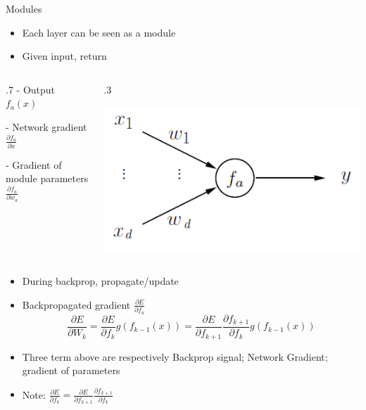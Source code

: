 \documentclass[12pt,notes,mathserif]{beamer}
\newcommand{\begincols}[1]{\begin{column}{#1}}
\newcommand{\stopcols}{\end{column}}
\newcommand{\pp}[2]{\frac{\partial #1}{\partial #2}}
\providecommand{\tightlist}{%
	\setlength{\itemsep}{0pt}\setlength{\parskip}{0pt}}
\begin{document}
\begin{frame}{Modules}

\begin{itemize}
\tightlist
\item
  Each layer can be seen as a module
\item
  Given input, return
\end{itemize}

\begin{columns}
    \begincols{.7\textwidth}
    - Output $f_{a}(x)$
    
    - Network gradient $\frac{\partial f_{a}}{\partial x}$
    
    - Gradient of module parameters $\frac{\partial f_{a}}{\partial w_a}$
    \stopcols
    \begincols{.3\textwidth}
    \begin{center}
        \includegraphics[width=\textwidth]{2018-04-15-13-09-43.png}
    \end{center}
    \stopcols
\end{columns}

\begin{itemize}
\tightlist
\item
  During backprop, propagate/update
\item
  Backpropagated gradient \(\frac{\partial E}{\partial f_{a}}\)
  \[\frac{\partial E}{\partial W_{k}}=\frac{\partial E}{\partial f_{k}} g(f_{k-1}( x))=\frac{\partial E}{\partial f_{k + 1} }\pp{f_{k+1}}{f_k}g(f_{k-1}(x))\]
\item
  Three term above are respectively Backprop signal; Network Gradient;
  gradient of parameters
\item
  Note:
  \(\frac{\partial E}{\partial f_{k}}=\pp{E}{f_{k+1}} \pp{f_{k+1}}{{f_k}}\)
\end{itemize}

\end{frame}
\end{document}

